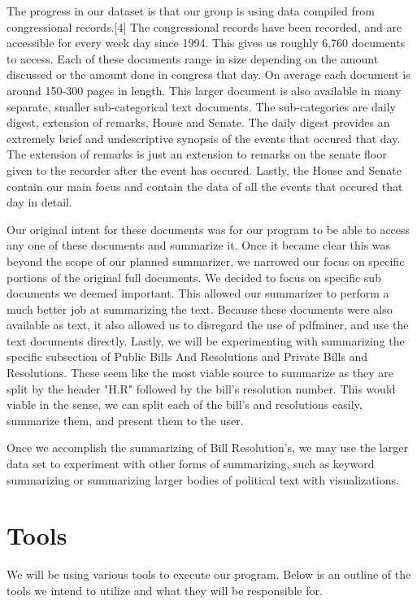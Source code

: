 \documentclass[11pt,a4paper]{article}
\begin{document}
The progress in our dataset is that our group is using data compiled from congressional records.[4] The congressional records have been recorded, and are accessible for every week day since 1994. This gives us roughly 6,760 documents to access. Each of these documents range in size depending on the amount discussed or the amount done in congress that day. On average each document is around 150-300 pages in length. This larger document is also available in many separate, smaller sub-categorical text documents. The sub-categories are daily digest, extension of remarks, House and Senate. The daily digest provides an extremely brief and undescriptive synopsis of the events that occured that day. The extension of remarks is just an extension to remarks on the senate floor given to the recorder after the event has occured. Lastly, the House and Senate contain our main focus and contain the data of all the events that occured that day in detail. 

Our original intent for these documents was for our program to be able to access any one of these documents and summarize it. Once it became clear this was beyond the scope of our planned summarizer, we narrowed our focus on specific portions of the original full documents. We decided to focus on specific sub documents we deemed important. This allowed our summarizer to perform a much better job at summarizing the text. Because these documents were also available as text, it also allowed us to disregard the use of pdfminer, and use the text documents directly. Lastly, we will be experimenting with summarizing the specific subsection of Public Bills And Resolutions and Private Bills and Resolutions. These seem like the most viable source to summarize as they are split by the header "H.R" followed by the bill's resolution number. This would viable in the sense, we can split each of the bill's and resolutions easily, summarize them, and present them to the user. 

Once we accomplish the summarizing of Bill Resolution's, we may use the larger data set to experiment with other forms of summarizing, such as keyword summarizing or summarizing larger bodies of political text with visualizations.  


\section{Tools}
We will be using various tools to execute our program. Below is an outline of the tools we intend to utilize and what they will be responsible for.
\end{document}
